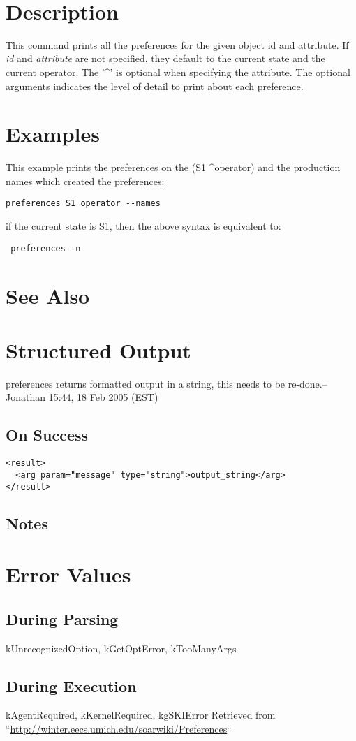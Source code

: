 \documentclass[10pt]{article}
\begin{document}
 \\ 

\section*{ Description }


 This command prints all the preferences for the given object id and attribute. If \emph{id}
 and \emph{attribute}
 are not specified, they default to the current state and the current operator. The '\^{}' is optional when specifying the attribute. The optional arguments indicates the level of detail to print about each preference. 
\section*{ Examples }


 This example prints the preferences on the (S1 \^{}operator) and the production names which created the preferences: \begin{verbatim}
preferences S1 operator --names

\end{verbatim}



 if the current state is S1, then the above syntax is equivalent to: \begin{verbatim}
 preferences -n

\end{verbatim}

\section*{ See Also }
\section*{ Structured Output }


 preferences returns formatted output in a string, this needs to be re-done.--Jonathan 15:44, 18 Feb 2005 (EST) 
\subsection*{ On Success }
\begin{verbatim}
<result>
  <arg param="message" type="string">output_string</arg>
</result>

\end{verbatim}
\subsection*{ Notes }
\section*{ Error Values }
\subsection*{ During Parsing }


 kUnrecognizedOption, kGetOptError, kTooManyArgs
\subsection*{ During Execution }


 kAgentRequired, kKernelRequired, kgSKIError Retrieved from ``\url{http://winter.eecs.umich.edu/soarwiki/Preferences}``
\end{document}
